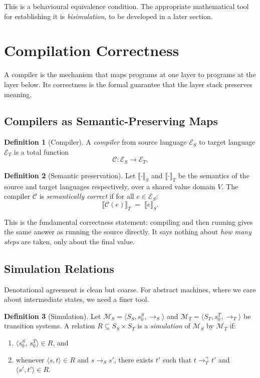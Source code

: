 \documentclass[11pt, a4paper]{article}
\theoremstyle{definition}
\newtheorem{definition}{Definition}[section]
\theoremstyle{plain}
\theoremstyle{remark}
\begin{document}
This is a behavioural equivalence condition. The appropriate mathematical
tool for establishing it is \emph{bisimulation}, to be developed in a later
section.


\section{Compilation Correctness}
\label{sec:compilation}

A compiler is the mechanism that maps programs at one layer to programs at
the layer below. Its correctness is the formal guarantee that the layer
stack preserves meaning.

\subsection{Compilers as Semantic-Preserving Maps}

\begin{definition}[Compiler]
  A \emph{compiler} from source language $\mathcal{E}_S$ to target language
  $\mathcal{E}_T$ is a total function
  \[
    \mathcal{C} : \mathcal{E}_S \to \mathcal{E}_T.
  \]
\end{definition}

\begin{definition}[Semantic preservation]
  Let $\llbracket \cdot \rrbracket_S$ and $\llbracket \cdot \rrbracket_T$ be
  the semantics of the source and target languages respectively, over a shared
  value domain $V$. The compiler $\mathcal{C}$ is \emph{semantically correct}
  if for all $e \in \mathcal{E}_S$:
  \[
    \llbracket \mathcal{C}(e) \rrbracket_T \;=\; \llbracket e \rrbracket_S.
  \]
\end{definition}

This is the fundamental correctness statement: compiling and then running
gives the same answer as running the source directly. It says nothing about
\emph{how many steps} are taken, only about the final value.

\subsection{Simulation Relations}

Denotational agreement is clean but coarse. For abstract machines, where we
care about intermediate states, we need a finer tool.

\begin{definition}[Simulation]
  Let $\mathcal{M}_S = \langle S_S, s_0^S, \to_S\rangle$ and
  $\mathcal{M}_T = \langle S_T, s_0^T, \to_T\rangle$ be transition systems.
  A relation $R \subseteq S_S \times S_T$ is a \emph{simulation} of
  $\mathcal{M}_S$ by $\mathcal{M}_T$ if:
  \begin{enumerate}
    \item $\langle s_0^S,\, s_0^T\rangle \in R$, and
    \item whenever $\langle s, t\rangle \in R$ and $s \to_S s'$, there exists $t'$ such
          that $t \to_T^{+} t'$ and $\langle s', t'\rangle \in R$.
  \end{enumerate}
\end{definition}
\end{document}
